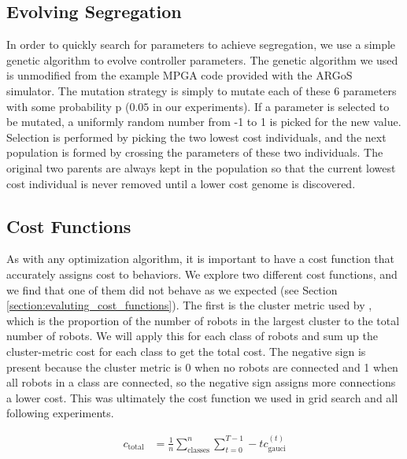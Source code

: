 \documentclass[conference]{IEEEtran}
\begin{document}
  \subsection{Evolving Segregation}

    In order to quickly search for parameters to achieve segregation, we use a simple genetic algorithm to evolve controller parameters. The genetic algorithm we used is unmodified from the example MPGA code provided with the ARGoS simulator. The mutation strategy is simply to mutate each of these 6 parameters with some probability p ($0.05$ in our experiments). If a parameter is selected to be mutated, a uniformly random number from -1 to 1 is picked for the new value. Selection is performed by picking the two lowest cost individuals, and the next population is formed by crossing the parameters of these two individuals. The original two parents are always kept in the population so that the current lowest cost individual is never removed until a lower cost genome is discovered.

  \subsection{Cost Functions}

    As with any optimization algorithm, it is important to have a cost function that accurately assigns cost to behaviors. We explore two different cost functions, and we find that one of them did not behave as we expected (see Section \ref{section:evaluting_cost_functions}). The first is the cluster metric used by \cite{gauci_self-organized_2014}, which is the proportion of the number of robots in the largest cluster to the total number of robots. We will apply this for each class of robots and sum up the cluster-metric cost for each class to get the total cost. The negative sign is present because the cluster metric is 0 when no robots are connected and 1 when all robots in a class are connected, so the negative sign assigns more connections a lower cost. This was ultimately the cost function we used in grid search and all following experiments.

    \begin{align*}
      c_{\text{total}} &=  \frac{1}{n}\sum^n_{\text{classes}}\sum_{t=0}^{T-1} -t c_{\text{gauci}}^{(t)} \\
    \end{align*}
\end{document}
